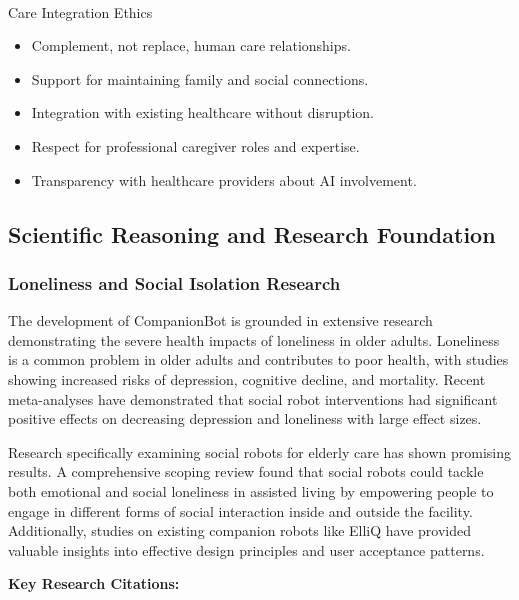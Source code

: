 \documentclass[
  letterpaper,
  DIV=11,
  numbers=noendperiod]{scrartcl}
\makeatletter
\let\oldparagraph\paragraph
\renewcommand{\paragraph}{
    \@ifstar
      \xxxParagraphStar
      \xxxParagraphNoStar
  }
\newcommand{\xxxParagraphStar}[1]{\oldparagraph*{#1}\mbox{}}
\newcommand{\xxxParagraphNoStar}[1]{\oldparagraph{#1}\mbox{}}
\providecommand{\tightlist}{%
  \setlength{\itemsep}{0pt}\setlength{\parskip}{0pt}}\usepackage{longtable,booktabs,array}
\makeatother
\begin{document}
\paragraph{Care Integration Ethics}\label{care-integration-ethics}

\begin{itemize}
\tightlist
\item
  Complement, not replace, human care relationships.
\item
  Support for maintaining family and social connections.
\item
  Integration with existing healthcare without disruption.
\item
  Respect for professional caregiver roles and expertise.
\item
  Transparency with healthcare providers about AI involvement.
\end{itemize}

\subsection{Scientific Reasoning and Research
Foundation}\label{scientific-reasoning-and-research-foundation}

\subsubsection{Loneliness and Social Isolation
Research}\label{loneliness-and-social-isolation-research}

The development of CompanionBot is grounded in extensive research
demonstrating the severe health impacts of loneliness in older adults.
Loneliness is a common problem in older adults and contributes to poor
health, with studies showing increased risks of depression, cognitive
decline, and mortality. Recent meta-analyses have demonstrated that
social robot interventions had significant positive effects on
decreasing depression and loneliness with large effect sizes.

Research specifically examining social robots for elderly care has shown
promising results. A comprehensive scoping review found that social
robots could tackle both emotional and social loneliness in assisted
living by empowering people to engage in different forms of social
interaction inside and outside the facility. Additionally, studies on
existing companion robots like ElliQ have provided valuable insights
into effective design principles and user acceptance patterns.

\textbf{Key Research Citations:}
\end{document}
